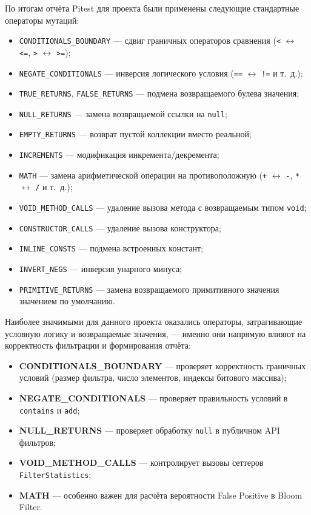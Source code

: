 По итогам отчёта Pitest для проекта были применены следующие стандартные операторы мутаций:
\begin{itemize}
    \item \texttt{CONDITIONALS\_BOUNDARY} --- сдвиг граничных операторов сравнения (\texttt{<} $\leftrightarrow$ \texttt{<=}, \texttt{>} $\leftrightarrow$ \texttt{>=});
    \item \texttt{NEGATE\_CONDITIONALS} --- инверсия логического условия (\texttt{==} $\leftrightarrow$ \texttt{!=} и т.~д.);
    \item \texttt{TRUE\_RETURNS}, \texttt{FALSE\_RETURNS} --- подмена возвращаемого булева значения;
    \item \texttt{NULL\_RETURNS} --- замена возвращаемой ссылки на \texttt{null};
    \item \texttt{EMPTY\_RETURNS} --- возврат пустой коллекции вместо реальной;
    \item \texttt{INCREMENTS} --- модификация инкремента/декремента;
    \item \texttt{MATH} --- замена арифметической операции на противоположную (\texttt{+} $\leftrightarrow$ \texttt{-}, \texttt{*} $\leftrightarrow$ \texttt{/} и т.~д.);
    \item \texttt{VOID\_METHOD\_CALLS} --- удаление вызова метода с возвращаемым типом \texttt{void};
    \item \texttt{CONSTRUCTOR\_CALLS} --- удаление вызова конструктора;
    \item \texttt{INLINE\_CONSTS} --- подмена встроенных констант;
    \item \texttt{INVERT\_NEGS} --- инверсия унарного минуса;
    \item \texttt{PRIMITIVE\_RETURNS} --- замена возвращаемого примитивного значения значением по умолчанию.
\end{itemize}

Наиболее значимыми для данного проекта оказались операторы, затрагивающие условную логику и возвращаемые значения, --- именно они напрямую влияют на корректность фильтрации и формирования отчёта:
\begin{itemize}
    \item \textbf{CONDITIONALS\_BOUNDARY} --- проверяет корректность граничных условий (размер фильтра, число элементов, индексы битового массива);
    \item \textbf{NEGATE\_CONDITIONALS} --- проверяет правильность условий в \texttt{contains} и \texttt{add};
    \item \textbf{NULL\_RETURNS} --- проверяет обработку \texttt{null} в публичном API фильтров;
    \item \textbf{VOID\_METHOD\_CALLS} --- контролирует вызовы сеттеров \texttt{FilterStatistics};
    \item \textbf{MATH} --- особенно важен для расчёта вероятности False Positive в Bloom Filter.
\end{itemize}

